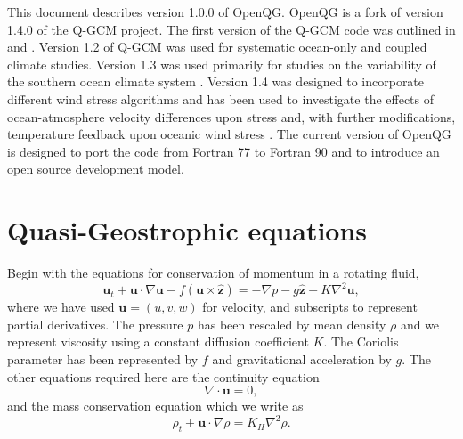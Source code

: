 \documentclass[11pt, a4paper,twoside]{article}
\newcommand{\vc}[1]{\mathbf{#1}}
\numberwithin{equation}{section}
\begin{document}
This document describes version 1.0.0 of OpenQG.
OpenQG is a fork of version 1.4.0 of the Q-GCM project.
The first version of the Q-GCM code was outlined in \citet{hogg:03b} and \citet{hogg:03c}.
Version 1.2 of Q-GCM was used for systematic ocean-only \citep{hogg:05a} and coupled climate \citep{hogg:06a,hogg:07} studies.
Version 1.3 was used primarily for studies on the variability of the southern ocean climate system \citep{hogg:06c,meredith:06,hogg:08b}.
Version 1.4 was designed to incorporate different wind stress algorithms and has been used to investigate the effects of ocean-atmosphere velocity differences upon stress \citep{hutchinson:10} and, with further modifications, temperature feedback upon oceanic wind stress \citep{hogg:09}.
The current version of OpenQG is designed to port the code from Fortran 77 to Fortran 90 and to introduce an open source development model.

\section{Quasi-Geostrophic equations}\label{sec:qg}
Begin with the equations for conservation of momentum in a rotating fluid,
\begin{equation}\label{eq:mom}
\vc{u}_t + \vc{u}\cdot\nabla\vc{u} - f(\vc{u}\times\vc{\hat{z}}) = -\nabla p -g\vc{\hat{z}} + K\nabla^2\vc{u},
\end{equation}
where we have used $\vc{u}=(u,v,w)$ for velocity, and subscripts to represent partial derivatives.
The pressure $p$ has been rescaled by mean density $\rho$ and we represent viscosity using a constant diffusion coefficient $K$.
The Coriolis parameter has been represented by $f$ and gravitational acceleration by $g$.
The other equations required here are the continuity equation
\begin{equation}\label{eq:cont}
\nabla\cdot\vc{u} = 0,
\end{equation}
and the mass conservation equation which we write as
\begin{equation}\label{eq:temp}
\rho_t + \vc{u}\cdot\nabla\rho = K_H\nabla^2\rho.
\end{equation}
\end{document}
